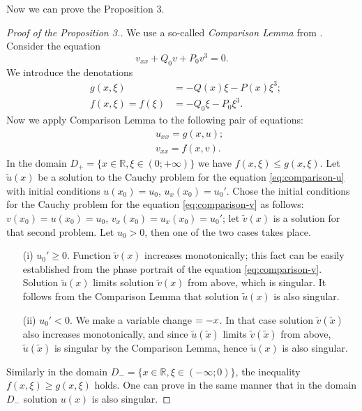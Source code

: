 Now we can prove the Proposition 3.
\begin{proof}[Proof of the Proposition 3.]
	We use a so-called {\it Comparison Lemma} from \cite[Appendix C]{AlfimovZezyulin}.
	Consider the equation
	\begin{equation}
		v_{xx} + Q_0 v + P_0 v^3 = 0.
	\end{equation}
	We introduce the denotations
	\begin{eqnarray}
		& g(x, \xi) & = -Q(x) \xi - P(x) \xi^3; \\
		& f(x, \xi) = f(\xi) & = -Q_0 \xi - P_0 \xi^3.
	\end{eqnarray}
	Now we apply Comparison Lemma to the following pair of equations:
	\begin{eqnarray}
		&& u_{xx} = g(x, u) \label{eq:comparison-u}; \\
		&& v_{xx} = f(x, v) \label{eq:comparison-v}.
	\end{eqnarray}
	In the domain $D_+ = \{ x \in \mathbb{R}, \xi \in (0; +\infty) \}$ we have $f(x, \xi) \le g(x, \xi)$.
	Let $\tilde{u}(x)$ be a solution to the Cauchy problem for the equation \eqref{eq:comparison-u} with initial conditions $u(x_0) = u_0$, $u_x(x_0) = u_0'$.
	Chose the initial conditions for the Cauchy problem for the equation \eqref{eq:comparison-v} as follows: $v(x_0) = u(x_0) = u_0$, $v_x(x_0) = u_x(x_0) = u_0'$; let $\tilde{v}(x)$ is a solution for that second problem.
	Let $u_0 > 0$, then one of the two cases takes place.
	\begin{enumerate}
		\item[(i)] $u_0' \ge 0$.
		Function $\tilde{v}(x)$ increases monotonically; this fact can be easily established from the phase portrait of the equation \eqref{eq:comparison-v}.
		Solution $\tilde{u}(x)$ limits solution $\tilde{v}(x)$ from above, which is singular.
		It follows from the Comparison Lemma that solution $\tilde{u}(x)$ is also singular.
		\item[(ii)] $u_0' < 0$.
		We make a variable change $\title{x} = -x$.
		In that case solution $\tilde{v}(\tilde{x})$ also increases monotonically, and since $\tilde{u}(\tilde{x})$ limits $\tilde{v}(\tilde{x})$ from above, $\tilde{u}(\tilde{x})$ is singular by the Comparison Lemma, hence $\tilde{u}(x)$ is also singular.
	\end{enumerate}
	Similarly in the domain $D_- = \{ x \in \mathbb{R}, \xi \in (-\infty; 0) \}$, the inequality $f(x, \xi) \ge g(x, \xi)$ holds.
	One can prove in the same manner that in the domain $D_-$ solution $u(x)$ is also singular.
\end{proof}

